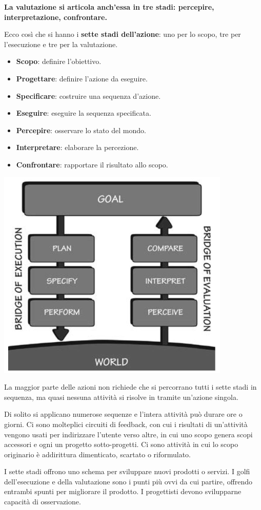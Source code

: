 \textbf{La valutazione si articola anch'essa in tre stadi: percepire, interpretazione, confrontare.}

Ecco così che si hanno i \textbf{sette stadi dell'azione}: uno per lo scopo, tre per l'esecuzione e tre per la valutazione.
\begin{itemize}
	\item \textbf{Scopo}: definire l'obiettivo.
	\item \textbf{Progettare}: definire l'azione da eseguire.
	\item \textbf{Specificare}: costruire una sequenza d'azione.
	\item \textbf{Eseguire}: eseguire la sequenza specificata.
	\item \textbf{Percepire}: osservare lo stato del mondo.
	\item \textbf{Interpretare}: elaborare la percezione.
	\item \textbf{Confrontare}: rapportare il risultato allo scopo.
\end{itemize}
\begin{center}
	\includegraphics[width=0.5\linewidth]{"../immagini/Sette stadi"}
\end{center}
La maggior parte delle azioni non richiede che si percorrano tutti i sette stadi in sequenza, ma quasi nessuna attività si risolve in tramite un'azione singola.

Di solito si applicano numerose sequenze e l'intera attività può durare ore o giorni. Ci sono molteplici circuiti di feedback, con cui i risultati di un'attività vengono usati per indirizzare l'utente verso altre, in cui uno scopo genera scopi accessori e ogni un progetto sotto-progetti. Ci sono attività in cui lo scopo originario è addirittura dimenticato, scartato o riformulato.

I sette stadi offrono uno schema per sviluppare nuovi prodotti o servizi. I golfi dell'esecuzione e della valutazione sono i punti più ovvi da cui partire, offrendo entrambi spunti per migliorare il prodotto. I progettisti devono svilupparne capacità di osservazione.

